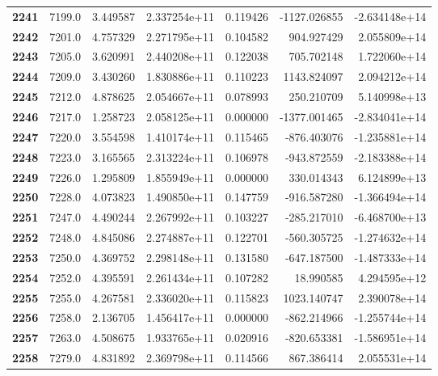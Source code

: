\documentclass{report}[12pt]
\begin{document}
\begin{center}
\begin{tabular}{lrrrrrr}
\textbf{2241} &         7199.0 &   3.449587 &  2.337254e+11 &    0.119426 & -1127.026855 & -2.634148e+14 \\
\textbf{2242} &         7201.0 &   4.757329 &  2.271795e+11 &    0.104582 &   904.927429 &  2.055809e+14 \\
\textbf{2243} &         7205.0 &   3.620991 &  2.440208e+11 &    0.122038 &   705.702148 &  1.722060e+14 \\
\textbf{2244} &         7209.0 &   3.430260 &  1.830886e+11 &    0.110223 &  1143.824097 &  2.094212e+14 \\
\textbf{2245} &         7212.0 &   4.878625 &  2.054667e+11 &    0.078993 &   250.210709 &  5.140998e+13 \\
\textbf{2246} &         7217.0 &   1.258723 &  2.058125e+11 &    0.000000 & -1377.001465 & -2.834041e+14 \\
\textbf{2247} &         7220.0 &   3.554598 &  1.410174e+11 &    0.115465 &  -876.403076 & -1.235881e+14 \\
\textbf{2248} &         7223.0 &   3.165565 &  2.313224e+11 &    0.106978 &  -943.872559 & -2.183388e+14 \\
\textbf{2249} &         7226.0 &   1.295809 &  1.855949e+11 &    0.000000 &   330.014343 &  6.124899e+13 \\
\textbf{2250} &         7228.0 &   4.073823 &  1.490850e+11 &    0.147759 &  -916.587280 & -1.366494e+14 \\
\textbf{2251} &         7247.0 &   4.490244 &  2.267992e+11 &    0.103227 &  -285.217010 & -6.468700e+13 \\
\textbf{2252} &         7248.0 &   4.845086 &  2.274887e+11 &    0.122701 &  -560.305725 & -1.274632e+14 \\
\textbf{2253} &         7250.0 &   4.369752 &  2.298148e+11 &    0.131580 &  -647.187500 & -1.487333e+14 \\
\textbf{2254} &         7252.0 &   4.395591 &  2.261434e+11 &    0.107282 &    18.990585 &  4.294595e+12 \\
\textbf{2255} &         7255.0 &   4.267581 &  2.336020e+11 &    0.115823 &  1023.140747 &  2.390078e+14 \\
\textbf{2256} &         7258.0 &   2.136705 &  1.456417e+11 &    0.000000 &  -862.214966 & -1.255744e+14 \\
\textbf{2257} &         7263.0 &   4.508675 &  1.933765e+11 &    0.020916 &  -820.653381 & -1.586951e+14 \\
\textbf{2258} &         7279.0 &   4.831892 &  2.369798e+11 &    0.114566 &   867.386414 &  2.055531e+14 \\

\end{tabular}
\end{center}
\end{document}
